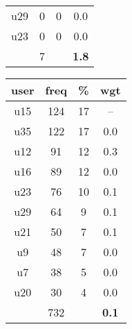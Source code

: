 \begin{appendices}
\begin{table}
\begin{tabular}{ |c|c|c|c| }
	u29 & 0 & 0 & 0.0 \\
	u23 & 0 & 0 & 0.0 \\
	 & 7 & & \textbf{1.8} \\
	\hline
\end{tabular}
\begin{tabular}{ |c|c|c|c| }
	\hline
	\textbf{user} & \textbf{freq} & \textbf{\%} & \textbf{wgt} \\
	\hline
	u15 & 124 & 17 & -- \\
	u35 & 122 & 17 & 0.0 \\
	u12 & 91 & 12 & 0.3 \\
	u16 & 89 & 12 & 0.0 \\
	u23 & 76 & 10 & 0.1 \\
	u29 & 64 & 9 & 0.1 \\
	u21 & 50 & 7 & 0.1 \\
	u9 & 48 & 7 & 0.0 \\
	u7 & 38 & 5 & 0.0 \\
	u20 & 30 & 4 & 0.0 \\
	 & 732 & & \textbf{0.1} \\
	\hline
\end{tabular}
\end{table}


\end{appendices}
